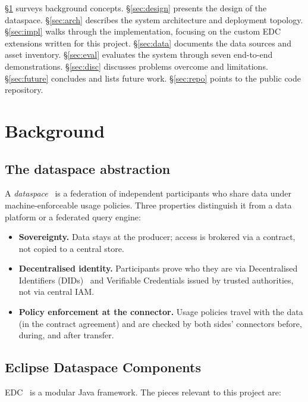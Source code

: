 \documentclass[11pt,a4paper]{article}
\begin{document}
§\ref{sec:background} surveys background concepts. §\ref{sec:design} presents
the design of the dataspace. §\ref{sec:arch} describes the system architecture
and deployment topology. §\ref{sec:impl} walks through the implementation,
focusing on the custom EDC extensions written for this project.
§\ref{sec:data} documents the data sources and asset inventory.
§\ref{sec:eval} evaluates the system through seven end-to-end demonstrations.
§\ref{sec:disc} discusses problems overcome and limitations.
§\ref{sec:future} concludes and lists future work.
§\ref{sec:repo} points to the public code repository.

\section{Background}
\label{sec:background}

\subsection{The dataspace abstraction}

A \emph{dataspace}~\cite{idsa-ram4} is a federation of independent participants
who share data under machine-enforceable usage policies. Three properties
distinguish it from a data platform or a federated query engine:

\begin{itemize}
  \item \textbf{Sovereignty.} Data stays at the producer; access is brokered
    via a contract, not copied to a central store.
  \item \textbf{Decentralised identity.} Participants prove who they are via
    Decentralised Identifiers (DIDs)~\cite{w3c-did} and Verifiable
    Credentials issued by trusted authorities, not via central IAM.
  \item \textbf{Policy enforcement at the connector.} Usage policies travel
    with the data (in the contract agreement) and are checked by both sides'
    connectors before, during, and after transfer.
\end{itemize}

\subsection{Eclipse Dataspace Components}

EDC~\cite{edc-project} is a modular Java framework. The pieces relevant to
this project are:
\end{document}
